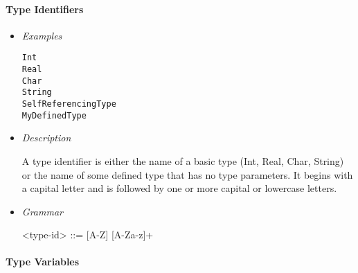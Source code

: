 \documentclass{article}
\begin{document}
\paragraph{Type Identifiers}

\begin{itemize}
\item \textit{Examples}
\begin{verbatim}
Int
Real 
Char 
String
SelfReferencingType
MyDefinedType
\end{verbatim}

\item \textit{Description}

A type identifier is either the name of a basic type (Int, Real, Char, String) or
the name of some defined type that has no type parameters. It begins with a capital
letter and is followed by one or more capital or lowercase letters.

\item \textit{Grammar}
\begin{grammar}
<type-id> ::= [A-Z] [A-Za-z]+ \\ 
\end{grammar}
\end{itemize}

\paragraph{Type Variables}
\end{document}
